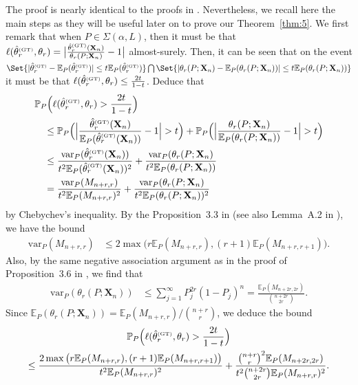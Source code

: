 \documentclass{article}
\newcommand{\1}{\boldsymbol{1}}
\newcommand{\EE}{\mathbb{E}}
\newcommand{\var}{\mathrm{var}}
\newcommand{\PP}{\mathbb{P}}
\theoremstyle{plain}
\begin{document}
The proof is nearly identical to the proofs in \cite{Ben(17)}. Nevertheless, we recall here the main steps as they will be useful later on to prove our Theorem~\ref{thm:5}. We first remark that when $P \in \Sigma(\alpha,L)$, then it must be that $\ell(\hat{\theta}_r^{\text{\tiny{(GT)}}},\theta_r) = \big|\frac{\hat{\theta}_r^{\text{\tiny{(GT)}}}(\mathbf{X}_n)}{\theta_r(P;\mathbf{X}_n)} - 1 \big|$ almost-surely. Then, it can be seen that on the event $\Set{|\hat{\theta}_r^{\text{\tiny{(GT)}}} - \EE_P(\hat{\theta}_r^{\text{\tiny{(GT)}}})| \leq t \EE_P(\hat{\theta}_r^{\text{\tiny{(GT)}}})} \bigcap \Set{|\theta_r(P;\mathbf{X}_n) - \EE_P(\theta_r(P;\mathbf{X}_n))| \leq t \EE_P(\theta_r(P;\mathbf{X}_n))}$ it must be that $\ell(\hat{\theta}_r^{\text{\tiny{(GT)}}},\theta_r) \leq \frac{2t}{1-t}$. Deduce that
\begin{align*}
 & \PP_P\Big(\ell(\hat{\theta}_r^{\text{\tiny{(GT)}}},\theta_r) > \frac{2t}{1-t} \Big)\\
  &\quad\leq \PP_P\Big(\Big|\frac{\hat{\theta}_r^{\text{\tiny{(GT)}}}(\mathbf{X}_n)}{\EE_P(\hat{\theta}_r^{\text{\tiny{(GT)}}}(\mathbf{X}_n))} - 1\Big| > t \Big)%
    + \PP_P\Big(\Big|\frac{\theta_r(P;\mathbf{X}_n)}{\EE_P(\theta_r(P;\mathbf{X}_n))} - 1\Big| > t \Big)\\
  &\quad\leq \frac{\var_P(\hat{\theta}_r^{\text{\tiny{(GT)}}}(\mathbf{X}_n))}{t^2\EE_P(\hat{\theta}_r^{\text{\tiny{(GT)}}}(\mathbf{X}_n))^2}%
    + \frac{\var_P(\theta_r(P;\mathbf{X}_n)}{t^2\EE_P(\theta_r(P;\mathbf{X}_n))}\\
  &\quad= \frac{\var_P(M_{n+r,r})}{t^2\EE_P(M_{n+r,r})^2}%
     + \frac{\var_P(\theta_r(P;\mathbf{X}_n)}{t^2\EE_P(\theta_r(P;\mathbf{X}_n))^2}
\end{align*}
by Chebychev's inequality. By the Proposition~3.3 in \cite{Ben(17)} (see also Lemma~A.2 in \cite{Fav(22)}), we have the bound
\begin{align*}
  \var_P(M_{n+r,r})%
  &\leq 2\max\Big(r \EE_P(M_{n+r,r}), (r+1)\EE_P(M_{n+r,r+1}) \Big).
\end{align*}
Also, by the same negative association argument as in the proof of Proposition~3.6 in \cite{Ben(17)}, we find that
\begin{align}
  \label{eq:56}
  \var_P(\theta_r(P;\mathbf{X}_n))%
  &\leq \sum_{j=1}^{\infty}P_j^{2r}(1-P_j)^n%
    = \frac{\EE_P(M_{n+2r,2r})}{\binom{n+2r}{2r}}.
\end{align}
Since $\EE_P(\theta_r(P;\mathbf{X}_n)) = \EE_P(M_{n+r,r}) \big/ \binom{n+r}{r}$, we deduce the bound
\begin{multline}
  \label{eq:58}
  \PP_P\Big(\ell(\hat{\theta}_r^{\text{\tiny{(GT)}}},\theta_r) > \frac{2t}{1-t} \Big)\\%
  \leq \frac{2\max\big(r \EE_P(M_{n+r,r}), (r+1)\EE_P(M_{n+r,r+1}) \big)}{t^2 \EE_P(M_{n+r,r})^2 }%
  +%
  \frac{\binom{n+r}{r}^2\EE_P(M_{n+2r,2r}) }{t^2 \binom{n+2r}{2r} \EE_P(M_{n+r,r})^2 }.
\end{multline}
\end{document}
